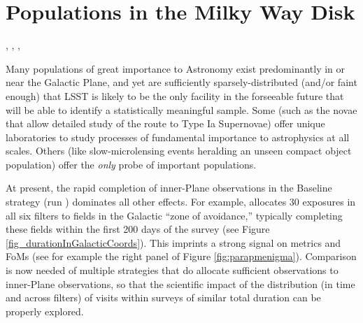 %
%
%

\section{Populations in the Milky Way Disk}
\def\secname{MW_Disk}\label{sec:\secname}

, , , 

Many populations of great importance to Astronomy exist predominantly
in or near the Galactic Plane, and yet are sufficiently
sparsely-distributed (and/or faint enough) that LSST is likely to be
the only facility in the forseeable future that will be able to
identify a statistically meaningful sample. Some (such as the novae
that allow detailed study of the route to Type Ia Supernovae) offer
unique laboratories to study processes of fundamental importance to
astrophysics at all scales. Others (like slow-microlensing events
  heralding an unseen compact object population) offer the {\it only}
probe of important populations.

At present, the rapid completion of inner-Plane observations in the
Baseline strategy (run ) dominates all
other effects. For example,  allocates 30
exposures in all six filters to fields in the Galactic ``zone of
avoidance,'' typically completing these fields within the first 200
days of the survey (see Figure
\ref{fig_durationInGalacticCoords}). This imprints a strong signal on
metrics and FoMs (see for example the right panel of Figure
\ref{fig:parapmenigma}). Comparison is now needed of multiple
strategies that do allocate sufficient observations to inner-Plane
observations, so that the scientific impact of the distribution (in
time and across filters) of visits within surveys of similar total
duration can be properly explored.

